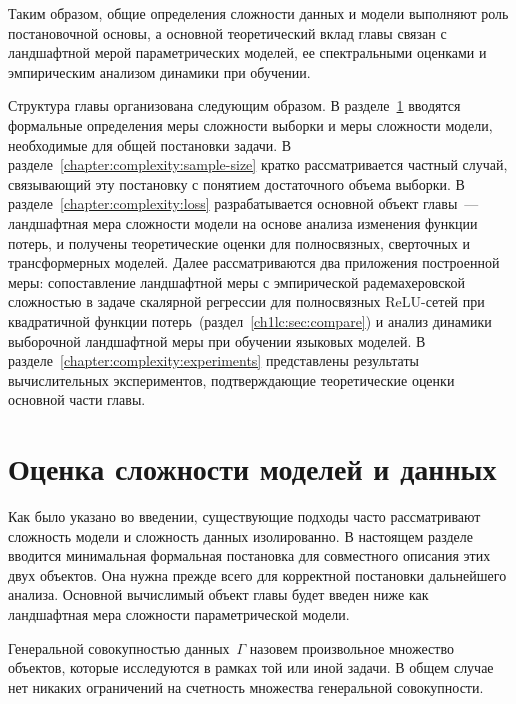 Таким образом, общие определения сложности данных и модели выполняют роль постановочной основы, а основной теоретический вклад главы связан с ландшафтной мерой параметрических моделей, ее спектральными оценками и эмпирическим анализом динамики при обучении.

Структура главы организована следующим образом. В разделе~\ref{chapter:complexity:models-data} вводятся формальные определения меры сложности выборки и меры сложности модели, необходимые для общей постановки задачи. В разделе~\ref{chapter:complexity:sample-size} кратко рассматривается частный случай, связывающий эту постановку с понятием достаточного объема выборки. В разделе~\ref{chapter:complexity:loss} разрабатывается основной объект главы~--- ландшафтная мера сложности модели на основе анализа изменения функции потерь, и получены теоретические оценки для полносвязных, сверточных и трансформерных моделей. Далее рассматриваются два приложения построенной меры: сопоставление ландшафтной меры с эмпирической радемахеровской сложностью в задаче скалярной регрессии для полносвязных ReLU-сетей при квадратичной функции потерь~(раздел~\ref{ch1lc:sec:compare}) и анализ динамики выборочной ландшафтной меры при обучении языковых моделей. В разделе~\ref{chapter:complexity:experiments} представлены результаты вычислительных экспериментов, подтверждающие теоретические оценки основной части главы.

\section{Оценка сложности моделей и данных}\label{chapter:complexity:models-data}

Как было указано во введении, существующие подходы часто рассматривают сложность модели и сложность данных изолированно. В настоящем разделе вводится минимальная формальная постановка для совместного описания этих двух объектов. Она нужна прежде всего для корректной постановки дальнейшего анализа. Основной вычислимый объект главы будет введен ниже как ландшафтная мера сложности параметрической модели.

\begin{definition}\label{chapter:complex:def-gamma}
    Генеральной совокупностью данных~$\Gamma$ назовем произвольное множество объектов, которые исследуются в рамках той или иной задачи. В общем случае нет никаких ограничений на счетность множества генеральной совокупности.
\end{definition}

